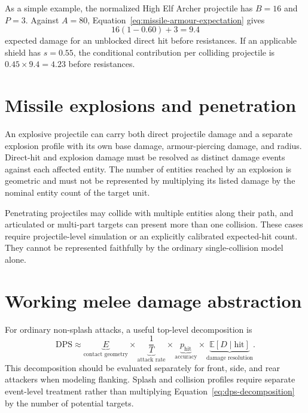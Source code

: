 \documentclass[11pt]{article}
\begin{document}
As a simple example, the normalized High Elf Archer projectile has $B=16$ and
$P=3$.  Against $A=80$, Equation~\ref{eq:missile-armour-expectation} gives
\begin{equation}
  16(1-0.60)+3=9.4
\end{equation}
expected damage for an unblocked direct hit before resistances.  If an
applicable shield has $s=0.55$, the conditional contribution per colliding
projectile is $0.45\times9.4=4.23$ before resistances.

\section{Missile explosions and penetration}

An explosive projectile can carry both direct projectile damage and a
separate explosion profile with its own base damage, armour-piercing damage,
and radius.  Direct-hit and explosion damage must be resolved as distinct
damage events against each affected entity.  The number of entities reached
by an explosion is geometric and must not be represented by multiplying its
listed damage by the nominal entity count of the target unit.

Penetrating projectiles may collide with multiple entities along their path,
and articulated or multi-part targets can present more than one collision.
These cases require projectile-level simulation or an explicitly calibrated
expected-hit count.  They cannot be represented faithfully by the ordinary
single-collision model alone.

\section{Working melee damage abstraction}

For ordinary non-splash attacks, a useful top-level decomposition is
\begin{equation}
  \mathrm{DPS}
  \approx
  \underbrace{E}_{\text{contact geometry}}
  \times
  \underbrace{\frac{1}{T}}_{\text{attack rate}}
  \times
  \underbrace{p_{\mathrm{hit}}}_{\text{accuracy}}
  \times
  \underbrace{\mathbb{E}[D\mid\mathrm{hit}]}_{\text{damage resolution}}.
  \label{eq:dps-decomposition}
\end{equation}
This decomposition should be evaluated separately for front, side, and rear
attackers when modeling flanking.  Splash and collision profiles require
separate event-level treatment rather than multiplying
Equation~\ref{eq:dps-decomposition} by the number of potential targets.
\end{document}
